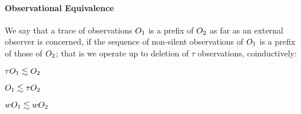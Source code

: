 \documentclass[acmsmall,review,anonymous]{acmart}\settopmatter{printfolios=true,printccs=false,printacmref=false}
\begin{document}

\paragraph*{Observational Equivalence}

We say that a trace of observations $O_1$ is a prefix of $O_2$
as far as an external observer is concerned, if the sequence of
non-silent observations of $O_1$ is a prefix of those of
$O_2$; that is we operate up to deletion of \(\tau\) observations,
coinductively:


\begin{minipage}{.3\textwidth}
  \judgment{}{\(\obsT \lesssim \obsT\)}
\end{minipage}
\begin{minipage}{.3\textwidth}
\judgment{}{\(\tau \lesssim \obsT\)}
\end{minipage}
\begin{minipage}{.3\textwidth}
\end{minipage}

\begin{minipage}{.3\textwidth}
         {\(\tau O_1 \lesssim O_2\)}
\end{minipage}
\begin{minipage}{.3\textwidth}
         {\(O_1 \lesssim \tau O_2\)}
\end{minipage}
\begin{minipage}{.3\textwidth}
         {\(wO_1 \lesssim wO_2\)}
\end{minipage}

\end{document}
